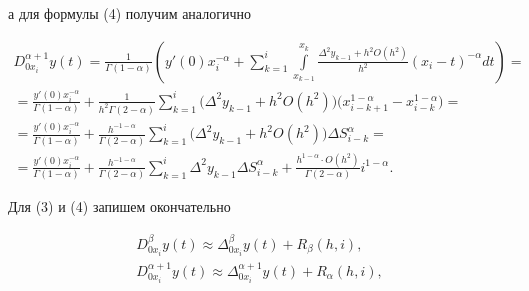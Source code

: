 а для формулы (4) получим аналогично 

\begin{multline}

D^{\alpha+1}_{0x_i} y(t)=\frac{1}{\Gamma(1-\alpha)}\left( 

y'(0)x_i^{-\alpha}+ 

\sum\limits_{k=1}^i \int\limits_{x_{k-1}}^{x_k} \frac{\Delta^2 y_{k-1}+ 

h^2 O(h^2)}{h^2}(x_i-t)^{-\alpha}dt\right)= 

\\

= \frac{y'(0)x_i^{-\alpha}}{\Gamma(1-\alpha)}+ 

\frac{1}{h^2\Gamma(2-\alpha)} 

\sum\limits_{k=1}^i  

\Big(\Delta^2 y_{k-1}+ 

h^2 O(h^2)\Big) \Big(x^{1-\alpha}_{i-k+1}-x^{1-\alpha}_{i-k}\Big)= 

\\

= \frac{y'(0)x_i^{-\alpha}}{\Gamma(1-\alpha)}+ 

\frac{h^{-1-\alpha}}{\Gamma(2-\alpha)} 

\sum\limits_{k=1}^i  

\Big(\Delta^2 y_{k-1}+ 

h^2 O(h^2)\Big) \Delta S^\alpha_{i-k}= 

\\

\label{ch6} 

=\frac{y'(0)x_i^{-\alpha}}{\Gamma(1-\alpha)}+ 

\frac{h^{-1-\alpha}}{\Gamma(2-\alpha)} 

\sum\limits_{k=1}^i  

\Delta^2 y_{k-1} \Delta S^\alpha_{i-k}+ 

\frac{h^{1-\alpha}\cdot O(h^{2})}{\Gamma(2-\alpha)}i^{1-\alpha}. 

\end{multline} 

 

Для (3) и (4) запишем окончательно  

\begin{gather} 

\label{ch7} 

D^{\beta}_{0x_i} y(t)\approx\Delta^\beta_{0x_i} y(t)+ 

R_\beta(h,i),\\ 

\label{ch8} 

D^{\alpha+1}_{0x_i} y(t)\approx 

\Delta^{\alpha+1}_{0x_i} y(t)+ 

R_\alpha(h,i), 

\end{gather} 

